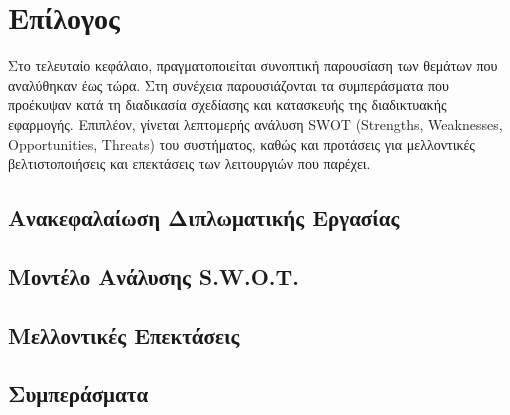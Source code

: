 \chapter{Επίλογος}
Στο τελευταίο κεφάλαιο, πραγματοποιείται συνοπτική παρουσίαση των θεμάτων που αναλύθηκαν έως τώρα. Στη συνέχεια παρουσιάζονται τα συμπεράσματα που προέκυψαν κατά τη διαδικασία σχεδίασης και κατασκευής της διαδικτυακής εφαρμογής.
Επιπλέον, γίνεται λεπτομερής ανάλυση SWOT (Strengths, Weaknesses, Opportunities, Threats) του συστήματος, καθώς και προτάσεις για μελλοντικές βελτιστοποιήσεις και επεκτάσεις των λειτουργιών που παρέχει.

\section{Ανακεφαλαίωση Διπλωματικής Εργασίας}

\section{Μοντέλο Ανάλυσης S.W.O.T.}

\section{Μελλοντικές Επεκτάσεις}

\section{Συμπεράσματα}
